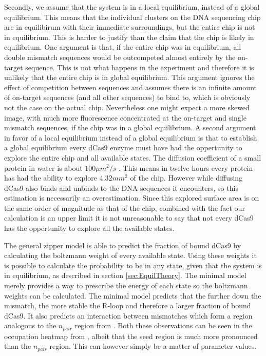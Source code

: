 Secondly, we assume that the system is in a local equilibrium, instead of a global equilibrium. This means that the individual clusters on the DNA sequencing chip are in equilibirum with their immediate surroundings, but the entire chip is not in equilibrium. %
This is harder to justify than the claim that the chip is likely in equilibrium. One argument is that, if the entire chip was in equilibrium, all double mismatch sequences would be outcompeted almost entirely by the on-target sequence. This is not what happens in the experiment and therefore it is unlikely that the entire chip is in global equilibrium. This argument ignores the effect of competition between sequences and assumes there is an infinite amount of on-target sequences (and all other sequences) to bind to, which is obviously not the case on the actual chip. Nevertheless one might expect a more skewed image, with much more fluorescence concentrated at the on-target and single mismatch sequences, if the chip was in a global equilibrium. A second argument in favor of a local equilibrium instead of a global equilibrium is that to establish a global equilibrium every dCas9 enzyme must have had the oppertunity to explore the entire chip and all available states. The diffusion coefficient of a small protein in water is about $100 \mu m^2/s$ \citep{brune1993predicting}.
This means in twelve hours every protein has had the ability to explore $4.32 mm^2$ of the chip. However while diffusing dCas9 also binds and unbinds to the DNA sequences it encounters, so this estimation is necessarily an overestimation. Since this explored surface area is on the same order of magnitude as that of the chip, combined with the fact our calculation is an upper limit it is not unreasonable to say that not every dCas9 has the oppertunity to explore all the available states. %

The general zipper model is able to predict the fraction of bound dCas9 by calculating the boltzmann weight of every available state. Using these weights it is possible to calculate the probability to be in any state, given that the system is in equilibrium, as described in section \ref{sec:EquilTheory}. The minimal model merely provides a way to prescribe the energy of each state so the boltzmann weights can be calculated. The minimal model predicts that the further down the mismatch, the more stable the R-loop and therefore a larger fraction of bound dCas9. It also predicts an interaction between mismatches which form a region analogous to the $n_{pair}$ region from \cite{Misha}. Both these observations can be seen in the occupation heatmap from \cite{PNAS}, albeit that the seed region is much more pronounced than the $n_{pair}$ region. This can however simply be a matter of parameter values.


